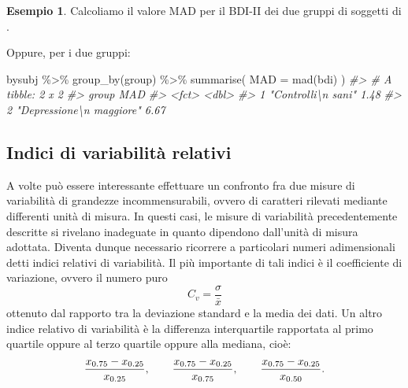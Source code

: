 \documentclass[
  10pt,
  italian,
  a4paper,
  extrafontsizes,onecolumn,openright
  ]{memoir}
\newenvironment{Shaded}{\begin{snugshade}}{\end{snugshade}}
\newcommand{\AttributeTok}[1]{\textcolor[rgb]{0.77,0.63,0.00}{#1}}
\newcommand{\CommentTok}[1]{\textcolor[rgb]{0.56,0.35,0.01}{\textit{#1}}}
\newcommand{\FloatTok}[1]{\textcolor[rgb]{0.00,0.00,0.81}{#1}}
\newcommand{\FunctionTok}[1]{\textcolor[rgb]{0.00,0.00,0.00}{#1}}
\newcommand{\NormalTok}[1]{#1}
\newcommand{\SpecialCharTok}[1]{\textcolor[rgb]{0.00,0.00,0.00}{#1}}
\theoremstyle{definition}
\theoremstyle{definition}
\newtheorem{example}{Esempio}[chapter]
\theoremstyle{definition}
\theoremstyle{definition}
\theoremstyle{remark}
\begin{document}
\begin{example}

Calcoliamo il valore MAD per il BDI-II dei due gruppi di soggetti di \textcite{zetschefuture2019}.

\begin{Shaded}
\end{Shaded}

Oppure, per i due gruppi:

\begin{Shaded}
\begin{Highlighting}[]
\NormalTok{bysubj }\SpecialCharTok{\%\textgreater{}\%}
  \FunctionTok{group\_by}\NormalTok{(group) }\SpecialCharTok{\%\textgreater{}\%}
  \FunctionTok{summarise}\NormalTok{(}
    \AttributeTok{MAD =} \FunctionTok{mad}\NormalTok{(bdi)}
\NormalTok{  )}
\CommentTok{\#\textgreater{} \# A tibble: 2 x 2}
\CommentTok{\#\textgreater{}   group                      MAD}
\CommentTok{\#\textgreater{}   \textless{}fct\textgreater{}                    \textless{}dbl\textgreater{}}
\CommentTok{\#\textgreater{} 1 "Controlli\textbackslash{}n sani"        1.48}
\CommentTok{\#\textgreater{} 2 "Depressione\textbackslash{}n maggiore"  6.67}
\end{Highlighting}
\end{Shaded}

\end{example}

\hypertarget{indici-di-variabilituxe0-relativi}{%
\subsection{Indici di variabilità relativi}\label{indici-di-variabilituxe0-relativi}}

A volte può essere interessante effettuare un confronto fra due misure
di variabilità di grandezze incommensurabili, ovvero di caratteri
rilevati mediante differenti unità di misura. In questi casi, le misure
di variabilità precedentemente descritte si rivelano inadeguate in
quanto dipendono dall'unità di misura adottata. Diventa dunque
necessario ricorrere a particolari numeri adimensionali detti indici
relativi di variabilità. Il più importante di tali indici è il
coefficiente di variazione, ovvero il numero puro
\[C_v = \frac{\sigma}{\bar{x}}\] ottenuto dal rapporto tra la deviazione
standard e la media dei dati. Un altro indice relativo di variabilità è
la differenza interquartile rapportata al primo quartile oppure al terzo
quartile oppure alla mediana, cioè:
\[\frac{x_{0.75} - x_{0.25}}{x_{0.25}}, \qquad \frac{x_{0.75} - x_{0.25}}{x_{0.75}}, \qquad \frac{x_{0.75} - x_{0.25}}{x_{0.50}}.\notag\]
\end{document}
